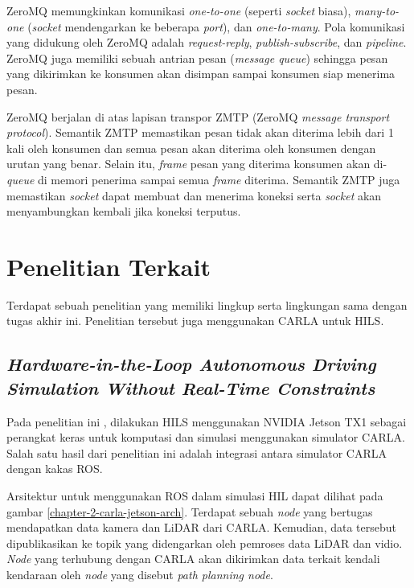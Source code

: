 ZeroMQ memungkinkan komunikasi \textit{one-to-one} (seperti \textit{socket}
biasa), \textit{many-to-one} (\textit{socket} mendengarkan ke beberapa
\textit{port}), dan \textit{one-to-many}. Pola komunikasi yang didukung oleh
ZeroMQ adalah \textit{request-reply}, \textit{publish-subscribe}, dan
\textit{pipeline}. ZeroMQ juga memiliki sebuah antrian pesan (\textit{message
    queue}) sehingga pesan yang dikirimkan ke konsumen akan disimpan
sampai konsumen siap menerima pesan.

ZeroMQ berjalan di atas lapisan transpor ZMTP (ZeroMQ \textit{message transport
    protocol}). Semantik ZMTP memastikan pesan tidak akan diterima lebih dari 1 kali
oleh konsumen dan semua pesan akan diterima oleh konsumen dengan urutan yang
benar. Selain itu, \textit{frame} pesan yang diterima konsumen akan
di-\textit{queue} di memori penerima sampai semua \textit{frame} diterima.
Semantik ZMTP juga memastikan \textit{socket} dapat membuat dan menerima koneksi
serta \textit{socket} akan menyambungkan kembali jika koneksi terputus.

\section{Penelitian Terkait}

Terdapat sebuah penelitian yang memiliki lingkup serta lingkungan sama dengan
tugas akhir ini. Penelitian tersebut juga menggunakan CARLA untuk HILS.

\subsection{\textit{Hardware-in-the-Loop Autonomous Driving Simulation Without
        Real-Time Constraints}}

Pada penelitian ini \parencite{brogle_CarlaHILS}, dilakukan HILS menggunakan
NVIDIA Jetson TX1 sebagai perangkat keras untuk komputasi dan simulasi
menggunakan simulator CARLA. Salah satu hasil dari penelitian ini adalah
integrasi antara simulator CARLA dengan kakas ROS.

Arsitektur untuk menggunakan ROS dalam simulasi HIL dapat dilihat pada gambar
\ref{chapter-2-carla-jetson-arch}. Terdapat sebuah \textit{node}  yang
bertugas mendapatkan data kamera dan LiDAR dari CARLA. Kemudian, data tersebut
dipublikasikan ke topik yang didengarkan oleh pemroses data LiDAR dan vidio.
\textit{Node} yang terhubung dengan CARLA akan dikirimkan data terkait kendali
kendaraan oleh \textit{node} yang disebut \textit{path planning node}.

